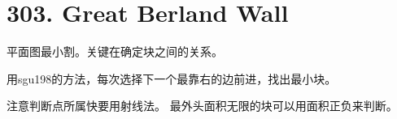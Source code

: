 \section{303. Great Berland Wall}
平面图最小割。关键在确定块之间的关系。\par
用sgu198的方法，每次选择下一个最靠右的边前进，找出最小块。
\par 注意判断点所属快要用射线法。
最外头面积无限的块可以用面积正负来判断。
